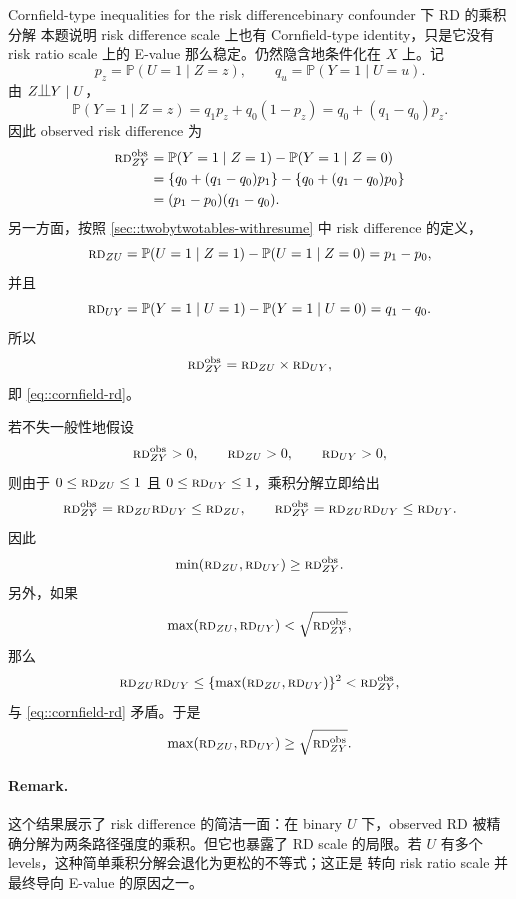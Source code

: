 \begin{exercisesolution}{Cornfield-type inequalities for the risk difference}{binary confounder 下 RD 的乘积分解}
本题说明 risk difference scale 上也有 Cornfield-type identity，只是它没有 risk ratio scale 上的 E-value 那么稳定。仍然隐含地条件化在 $X$ 上。记
\[
p_z=\mathbb{P}(U=1\mid Z=z),\qquad
q_u=\mathbb{P}(Y=1\mid U=u).
\]
由 $Z\ind Y\mid U$，
\[
\mathbb{P}(Y=1\mid Z=z)
=q_1p_z+q_0(1-p_z)
=q_0+(q_1-q_0)p_z.
\]
因此 observed risk difference 为
\begin{align*}
\textsc{rd}_{ZY}^{\textup{obs}}
&=\mathbb{P}(Y=1\mid Z=1)-\mathbb{P}(Y=1\mid Z=0)\\
&=\{q_0+(q_1-q_0)p_1\}
  -\{q_0+(q_1-q_0)p_0\}\\
&=(p_1-p_0)(q_1-q_0).
\end{align*}
另一方面，按照 \cref{sec::twobytwotables-withresume} 中 risk difference 的定义，
\[
\textsc{rd}_{ZU}
=\mathbb{P}(U=1\mid Z=1)-\mathbb{P}(U=1\mid Z=0)
=p_1-p_0,
\]
并且
\[
\textsc{rd}_{UY}
=\mathbb{P}(Y=1\mid U=1)-\mathbb{P}(Y=1\mid U=0)
=q_1-q_0.
\]
所以
\[
\textsc{rd}_{ZY}^{\textup{obs}}=\textsc{rd}_{ZU}\times \textsc{rd}_{UY},
\]
即 \cref{eq::cornfield-rd}。

若不失一般性地假设
\[
\textsc{rd}_{ZY}^{\textup{obs}}>0,\qquad \textsc{rd}_{ZU}>0,\qquad \textsc{rd}_{UY}>0,
\]
则由于 $0\leq \textsc{rd}_{ZU}\leq 1$ 且 $0\leq \textsc{rd}_{UY}\leq 1$，乘积分解立即给出
\[
\textsc{rd}_{ZY}^{\textup{obs}}
=\textsc{rd}_{ZU}\textsc{rd}_{UY}
\leq \textsc{rd}_{ZU},
\qquad
\textsc{rd}_{ZY}^{\textup{obs}}
=\textsc{rd}_{ZU}\textsc{rd}_{UY}
\leq \textsc{rd}_{UY}.
\]
因此
\[
\min(\textsc{rd}_{ZU},\textsc{rd}_{UY})\geq \textsc{rd}_{ZY}^{\textup{obs}}.
\]
另外，如果
\[
\max(\textsc{rd}_{ZU},\textsc{rd}_{UY})<\sqrt{\textsc{rd}_{ZY}^{\textup{obs}}},
\]
那么
\[
\textsc{rd}_{ZU}\textsc{rd}_{UY}
\leq \{\max(\textsc{rd}_{ZU},\textsc{rd}_{UY})\}^2
<\textsc{rd}_{ZY}^{\textup{obs}},
\]
与 \cref{eq::cornfield-rd} 矛盾。于是
\[
\max(\textsc{rd}_{ZU},\textsc{rd}_{UY})\geq \sqrt{\textsc{rd}_{ZY}^{\textup{obs}}}.
\]

\paragraph{Remark.}
这个结果展示了 risk difference 的简洁一面：在 binary $U$ 下，observed RD 被精确分解为两条路径强度的乘积。但它也暴露了 RD scale 的局限。若 $U$ 有多个 levels，这种简单乘积分解会退化为更松的不等式；这正是 \citet{ding2016sensitivity} 转向 risk ratio scale 并最终导向 E-value 的原因之一。
\end{exercisesolution}
